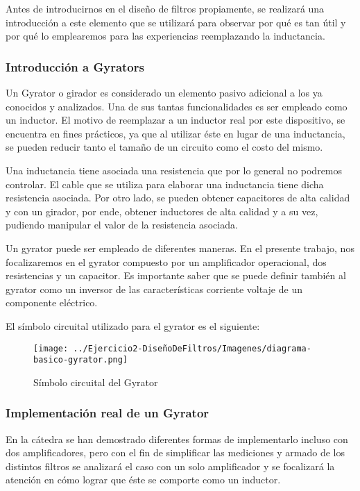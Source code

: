 Antes de introducirnos en el diseño de filtros propiamente, se realizará una introducción a este elemento que se utilizará para observar
por qué es tan útil y por qué lo emplearemos para las experiencias reemplazando la inductancia.

\subsubsection{Introducción a Gyrators}

Un Gyrator o girador es considerado un elemento pasivo adicional a los ya conocidos y analizados. Una de sus tantas funcionalidades es ser empleado como un inductor. 
El motivo de reemplazar a un inductor real por este dispositivo, se encuentra en fines prácticos, ya que al utilizar éste en lugar de una inductancia, se pueden reducir 
tanto el tamaño de un circuito como el costo del mismo. 

Una inductancia tiene asociada una resistencia que por lo general no podremos controlar. El cable que se utiliza para elaborar una inductancia tiene dicha resistencia asociada. 
Por otro lado, se pueden obtener capacitores de alta calidad y con un girador, por ende, obtener inductores de alta calidad y a su vez, pudiendo manipular el valor de la resistencia asociada.

Un gyrator puede ser empleado de diferentes maneras. En el presente trabajo, nos focalizaremos en el gyrator compuesto por un amplificador operacional, dos resistencias y un capacitor.
Es importante saber que se puede definir también al gyrator como un inversor de las características corriente voltaje de un componente eléctrico.

El símbolo circuital utilizado para el gyrator es el siguiente:

\begin{figure}[H]
    \centering
    \texttt{[image: ../Ejercicio2-DiseñoDeFiltros/Imagenes/diagrama-basico-gyrator.png]}
    \caption{Símbolo circuital del Gyrator}
\end{figure}

\subsubsection{Implementación real de un Gyrator}

En la cátedra se han demostrado diferentes formas de implementarlo incluso con dos amplificadores, pero con el fin de simplificar las mediciones
y armado de los distintos filtros se analizará el caso con un solo amplificador y se focalizará la atención en cómo lograr que éste se comporte como un 
inductor.

